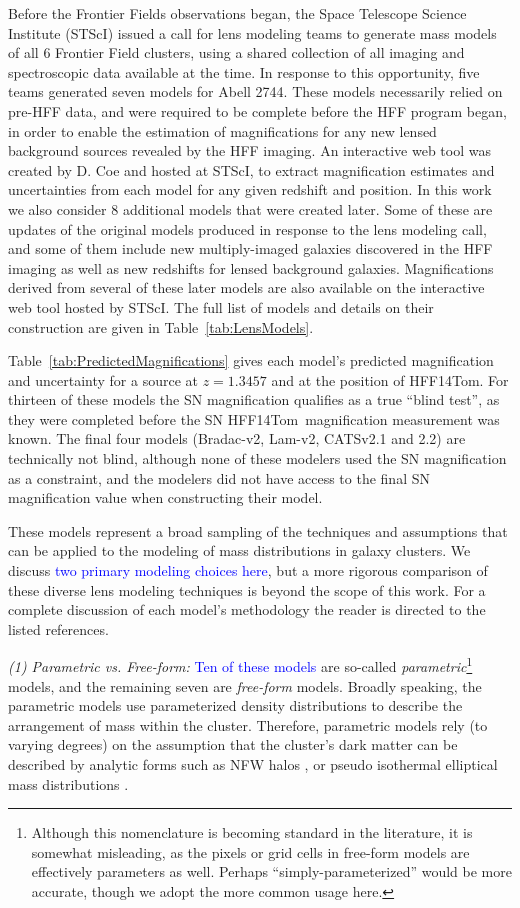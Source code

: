 \documentclass[iop]{emulateapj}
\newcommand{\change}[1]{{ \textcolor{blue}{#1}}}
\newcommand{\change}[1]{#1}
\def\tomas{HFF14Tom}
\begin{document}
Before the Frontier Fields observations began, the Space Telescope
Science Institute (STScI) issued a call for lens modeling teams to
generate mass models of all 6 Frontier Field clusters, using a shared
collection of all imaging and spectroscopic data available at the
time.  In response to this opportunity, five teams generated seven
models for Abell 2744.  These models necessarily relied on
pre-HFF data, and were required to be complete before the HFF program
began, in order to enable the estimation of magnifications for any new
lensed background sources revealed by the HFF imaging. An interactive
web tool was created by D. Coe and hosted at STScI, to extract
magnification estimates and uncertainties from each model for any
given redshift and position.  In this work we also consider 8
additional models that were created later.  Some of these are
updates of the original models produced in response to the lens
modeling call,  and some of them include new
multiply-imaged galaxies discovered in the HFF imaging as well as new
redshifts for lensed background galaxies.  Magnifications derived from
several of these later models are also available on the interactive
web tool hosted by STScI.  The full list of models and details on
their construction are given in Table~\ref{tab:LensModels}.



Table~\ref{tab:PredictedMagnifications} gives each model's predicted
magnification and uncertainty for a source at $z=1.3457$ and at the
position of \tomas.  
For thirteen of these models the SN magnification qualifies as a true
``blind test'', as they were completed before the SN \tomas\
magnification measurement was known.  The final four models
(Bradac-v2, Lam-v2, CATSv2.1 and 2.2) are technically not blind,
although none of these modelers used the SN magnification as a
constraint, and the modelers did not have access to the final SN
magnification value when constructing their model.

These models represent a broad sampling of the
techniques and assumptions that can be applied to the modeling of mass
distributions in galaxy clusters. 
We discuss \change{two primary modeling choices here}, but
a more rigorous comparison of these diverse lens modeling techniques
is beyond the scope of this work. For a complete discussion of each
model's methodology the reader is directed to the listed references.

\smallskip
{\it (1) Parametric vs. Free-form:}
\change{Ten of these models} are so-called {\it parametric}\footnote{Although this
nomenclature is becoming standard in the literature, it is somewhat
misleading, as the pixels or grid cells in free-form models are
effectively parameters as well. Perhaps ``simply-parameterized'' would
be more accurate, though we adopt the more common usage here.}
models, and the remaining seven are {\it free-form} models.  
Broadly speaking, the parametric models use parameterized density
distributions to describe the arrangement of mass within the cluster.
Therefore, parametric models rely (to
varying degrees) on the assumption that the cluster's dark matter can
be described by analytic forms such as NFW halos \citep{Navarro:1997},
or pseudo isothermal elliptical mass
distributions \citep[PIEMD][]{Kassiola:1993}.
\end{document}
